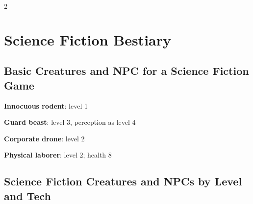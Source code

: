 \begin{multicols}{2}

\chapter{Science Fiction Bestiary}

\section{Basic Creatures and NPC for a Science Fiction Game}

\textbf{Innocuous rodent}: level 1

\textbf{Guard beast}: level 3, perception as level 4

\textbf{Corporate drone}: level 2

\textbf{Physical laborer}: level 2; health 8

\section{Science Fiction Creatures and NPCs by Level and Tech}

\end{multicols}

\newpage

